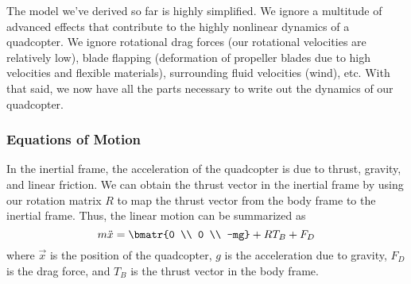 \documentclass{article}
\begin{document}
The model we've derived so far is highly simplified. We ignore a multitude of advanced effects that
contribute to the highly nonlinear dynamics of a quadcopter. We ignore rotational drag forces (our rotational velocities are relatively low),
blade flapping (deformation of propeller blades due to high velocities and flexible materials), surrounding fluid velocities (wind), etc.
With that said, we now have all the parts necessary to write out the dynamics of our quadcopter.

\subsubsection*{Equations of Motion}
In the inertial frame, the acceleration of the quadcopter is due to thrust, gravity, and linear
friction. We can obtain the thrust vector in the inertial frame by using our rotation matrix $R$ to
map the thrust vector from the body frame to the inertial frame. Thus, the linear motion can be
summarized as
\[m\ddot{x} = \bmatr{0 \\ 0 \\ -mg} + RT_B + F_D\]
where $\vec x$ is the position of the quadcopter, $g$ is the acceleration due to gravity, $F_D$ is
the drag force, and $T_B$ is the thrust vector in the body frame. 
%
\end{document}
